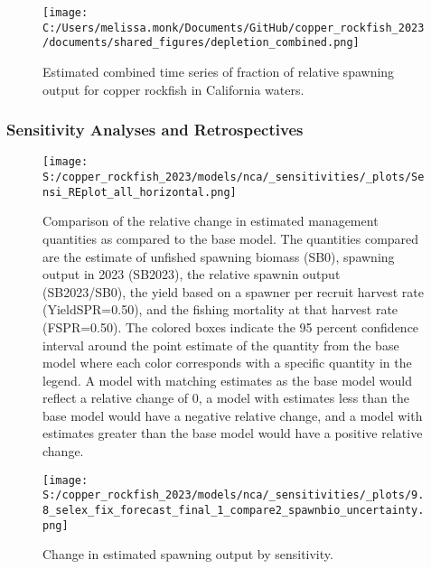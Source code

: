 \documentclass[11pt,
  english,
  letterpaper,
]{article}
\begin{document}
\clearpage

\begin{figure}
\centering
\texttt{[image: C:/Users/melissa.monk/Documents/GitHub/copper\_rockfish\_2023/documents/shared\_figures/depletion\_combined.png]}
\caption{Estimated combined time series of fraction of relative spawning output for copper rockfish in California waters.\label{fig:depl-all}}
\end{figure}

\clearpage

\hypertarget{sensitivity-analyses-and-retrospectives}{%
\subsubsection{Sensitivity Analyses and Retrospectives}\label{sensitivity-analyses-and-retrospectives}}

\begin{figure}
\centering
\texttt{[image: S:/copper\_rockfish\_2023/models/nca/\_sensitivities/\_plots/Sensi\_REplot\_all\_horizontal.png]}
\caption{Comparison of the relative change in estimated management quantities as compared to the base model. The quantities compared are the estimate of unfished spawning biomass (SB0), spawning output in 2023 (SB2023), the relative spawnin output (SB2023/SB0), the yield based on a spawner per recruit harvest rate (YieldSPR=0.50), and the fishing mortality at that harvest rate (FSPR=0.50). The colored boxes indicate the 95 percent confidence interval around the point estimate of the quantity from the base model where each color corresponds with a specific quantity in the legend. A model with matching estimates as the base model would reflect a relative change of 0, a model with estimates less than the base model would have a negative relative change, and a model with estimates greater than the base model would have a positive relative change.\label{fig:sens-all}}
\end{figure}

\newpage

\begin{figure}
\centering
\texttt{[image: S:/copper\_rockfish\_2023/models/nca/\_sensitivities/\_plots/9.8\_selex\_fix\_forecast\_final\_1\_compare2\_spawnbio\_uncertainty.png]}
\caption{Change in estimated spawning output by sensitivity.\label{fig:sens-ssb-1}}
\end{figure}

\newpage
\end{document}
